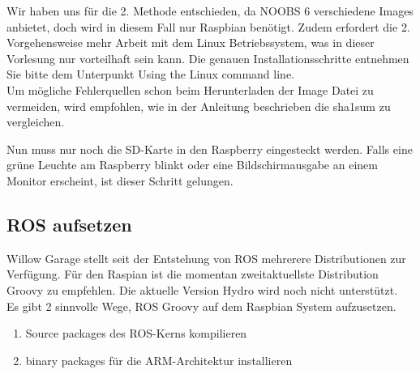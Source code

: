 \documentclass[12pt]{article}
\begin{document}
Wir haben uns für die 2. Methode entschieden, da NOOBS 6 verschiedene Images anbietet, doch wird in diesem Fall nur Raspbian benötigt.
Zudem erfordert die 2. Vorgehensweise mehr Arbeit mit dem Linux Betriebssystem, was in dieser Vorlesung nur vorteilhaft sein kann.
Die genauen Installationsschritte entnehmen Sie bitte dem Unterpunkt Using the Linux command line. \cite{SDCard}
\\
Um mögliche Fehlerquellen schon beim Herunterladen der Image Datei zu vermeiden, wird empfohlen, wie in der Anleitung beschrieben die sha1sum zu vergleichen.

Nun muss nur noch die SD-Karte in den Raspberry eingesteckt werden. Falls eine grüne Leuchte am Raspberry blinkt oder eine Bildschirmausgabe an einem Monitor erscheint, ist dieser Schritt gelungen.

\subsection{ROS aufsetzen}
Willow Garage stellt seit der Entstehung von ROS mehrerere Distributionen zur Verfügung.
Für den Raspian ist die momentan zweitaktuellste Distribution Groovy zu empfehlen. 
Die aktuelle Version Hydro wird noch nicht unterstützt. \\
Es gibt 2 sinnvolle Wege, ROS Groovy auf dem Raspbian System aufzusetzen.
\begin{enumerate}
\item Source packages des ROS-Kerns kompilieren
\item binary packages für die ARM-Architektur installieren
\end{enumerate}
\end{document}

